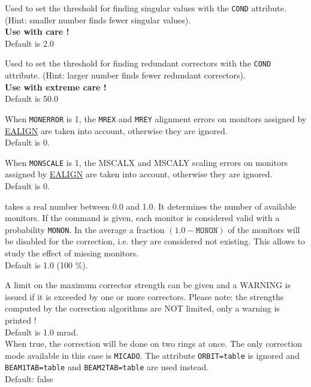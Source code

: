 \begin{madlist}
     Used to set the threshold for finding singular values
     with the {\tt COND} attribute. (Hint: smaller number finds fewer singular
     values).  
     \\ {\bf Use with care ! }
     \\ Default is 2.0 

     Used to set the threshold for finding redundant
     correctors with the {\tt COND} attribute. (Hint: larger number finds fewer
     redundant correctors).  
     \\ {\bf Use with extreme care ! }
     \\ Default is 50.0 

    When {\tt MONERROR} is 1, the {\tt MREX} and {\tt MREY} 
     alignment errors on monitors assigned  by \hyperref[sec:ealign]{EALIGN} 
     are taken into account, otherwise they are ignored.
     \\ Default is 0. 

    When {\tt MONSCALE} is 1, the MSCALX and
     MSCALY scaling errors on monitors assigned  by \hyperref[sec:ealign]{EALIGN}  
     are taken into account, otherwise they are ignored.
     \\ Default is 0. 

    takes a real number between 0.0 and 1.0. It
     determines the number of available monitors. If the command is
     given, each monitor is considered valid with a probability
     {\tt MONON}. In the average a fraction $(1.0 - \texttt{MONON})$ 
     of the monitors will be disabled for the correction, i.e. they are 
     considered not existing.  This allows to study the effect of missing monitors.
     \\ Default is 1.0 (100 \%). 

     A limit on the maximum corrector strength can be
     given and a WARNING is issued if it is exceeded by one or more
     correctors.  Please note: the strengths computed by the correction
     algorithms are NOT limited, only a warning is printed ! 
     \\ Default is 1.0 mrad. \\

    When true, the correction will be done on two rings at
     once. The only correction mode available in this case is
     {\tt MICADO}. The attribute {\tt ORBIT=table} is ignored and {\tt BEAM1TAB=table} and
     {\tt BEAM2TAB=table} are used instead.  
     \\ Default: false \\


\end{madlist}
